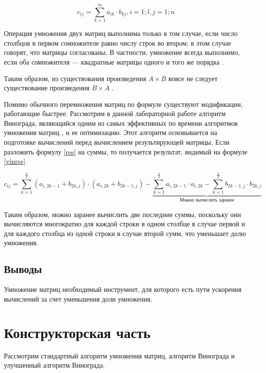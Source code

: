 \documentclass[a4paper,12pt]{article}
\begin{document}
\begin{equation}\label{res}
    c_{ij} = \sum_{k=1}^m a_{ik} \cdot b_{kj}, i = \overline{1;l}, j = \overline{1;n}
\end{equation}

Операция умножения двух матриц выполнима только в том случае, если число столбцов в
первом сомножителе равно числу строк во втором; в этом случае говорят, что матрицы
согласованы. В частности, умножение всегда выполнимо, если оба сомножителя —
квадратные матрицы одного и того же порядка \cite{litr}.

Таким образом, из существования произведения $A \times B$ вовсе не следует
существование произведения $B \times A$ \cite{litr}.

Помимо обычного перемножения матриц по формуле существуют модификации, работающие
быстрее. Рассмотрим в данной лабораторной работе алгоритм Винограда, являющийся одним
из самых эффективных по времени алгоритмов умножения матриц \cite{haskell},
и ее оптимизацию. Этот алгоритм основывается на подготовке вычислений перед вычислением
результирующей матрицы. Если разложить формулу \ref{res} на суммы, то получается
результат, видимый на формуле \ref{vinres}.

\begin{equation}\label{vinres}
    c_{ij} =
    \sum_{k=1}^{\frac{n}{2}} (a_{i,2k-1} + b_{2k,j}) \cdot (a_{i,2k} + b_{2k-1,j}) -
    \underbrace{\sum_{k=1}^{\frac{n}{2}} a_{i,2k-1} \cdot a_{i,2k} -
    \sum_{k=1}^{\frac{n}{2}} b_{2k-1,j} \cdot b_{2k,j}}_\text{Можно вычислить заранее}
\end{equation}

Таким образом, можно заранее вычислить две последние суммы, поскольку они вычисляются
многократно для каждой строки в одном столбце в случае первой и для каждого столбца
из одной строки в случае второй сумм, что уменьшает долю умножения\cite{haskell}.

\subsection{Выводы}

Умножение матриц необходимый инструмент, для которого есть пути ускорения вычислений
за счет уменьшения доли умножения.

\newpage
\section{Конструкторская часть}

Рассмотрим стандартный алгоритм умножения матриц, алгоритм Винограда и улучшенный
алгоритм Винограда.
\end{document}
